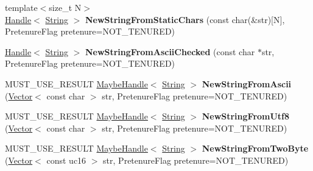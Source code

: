 \begin{DoxyCompactItemize}
\item 
{\footnotesize template$<$size\+\_\+t N$>$ }\\\hyperlink{classv8_1_1internal_1_1_handle}{Handle}$<$ \hyperlink{classv8_1_1internal_1_1_string}{String} $>$ {\bfseries New\+String\+From\+Static\+Chars} (const char(\&str)\mbox{[}N\mbox{]}, Pretenure\+Flag pretenure=N\+O\+T\+\_\+\+T\+E\+N\+U\+R\+ED)\hypertarget{classv8_1_1internal_1_1_factory_a6a46835b8b92cc0f40c98e15c2a3cfae}{}\label{classv8_1_1internal_1_1_factory_a6a46835b8b92cc0f40c98e15c2a3cfae}

\item 
\hyperlink{classv8_1_1internal_1_1_handle}{Handle}$<$ \hyperlink{classv8_1_1internal_1_1_string}{String} $>$ {\bfseries New\+String\+From\+Ascii\+Checked} (const char $\ast$str, Pretenure\+Flag pretenure=N\+O\+T\+\_\+\+T\+E\+N\+U\+R\+ED)\hypertarget{classv8_1_1internal_1_1_factory_a1671a135506755e182e579e1260f7068}{}\label{classv8_1_1internal_1_1_factory_a1671a135506755e182e579e1260f7068}

\item 
M\+U\+S\+T\+\_\+\+U\+S\+E\+\_\+\+R\+E\+S\+U\+LT \hyperlink{classv8_1_1internal_1_1_maybe_handle}{Maybe\+Handle}$<$ \hyperlink{classv8_1_1internal_1_1_string}{String} $>$ {\bfseries New\+String\+From\+Ascii} (\hyperlink{classv8_1_1internal_1_1_vector}{Vector}$<$ const char $>$ str, Pretenure\+Flag pretenure=N\+O\+T\+\_\+\+T\+E\+N\+U\+R\+ED)\hypertarget{classv8_1_1internal_1_1_factory_a0997f4f8a2f37cf0b9430754b5b92e0f}{}\label{classv8_1_1internal_1_1_factory_a0997f4f8a2f37cf0b9430754b5b92e0f}

\item 
M\+U\+S\+T\+\_\+\+U\+S\+E\+\_\+\+R\+E\+S\+U\+LT \hyperlink{classv8_1_1internal_1_1_maybe_handle}{Maybe\+Handle}$<$ \hyperlink{classv8_1_1internal_1_1_string}{String} $>$ {\bfseries New\+String\+From\+Utf8} (\hyperlink{classv8_1_1internal_1_1_vector}{Vector}$<$ const char $>$ str, Pretenure\+Flag pretenure=N\+O\+T\+\_\+\+T\+E\+N\+U\+R\+ED)\hypertarget{classv8_1_1internal_1_1_factory_ad67ceaccf02566a88f8e29c55b73625e}{}\label{classv8_1_1internal_1_1_factory_ad67ceaccf02566a88f8e29c55b73625e}

\item 
M\+U\+S\+T\+\_\+\+U\+S\+E\+\_\+\+R\+E\+S\+U\+LT \hyperlink{classv8_1_1internal_1_1_maybe_handle}{Maybe\+Handle}$<$ \hyperlink{classv8_1_1internal_1_1_string}{String} $>$ {\bfseries New\+String\+From\+Two\+Byte} (\hyperlink{classv8_1_1internal_1_1_vector}{Vector}$<$ const uc16 $>$ str, Pretenure\+Flag pretenure=N\+O\+T\+\_\+\+T\+E\+N\+U\+R\+ED)\hypertarget{classv8_1_1internal_1_1_factory_a09d396b0be074c77c608cdc624d45f0d}{}\label{classv8_1_1internal_1_1_factory_a09d396b0be074c77c608cdc624d45f0d}


\end{DoxyCompactItemize}
